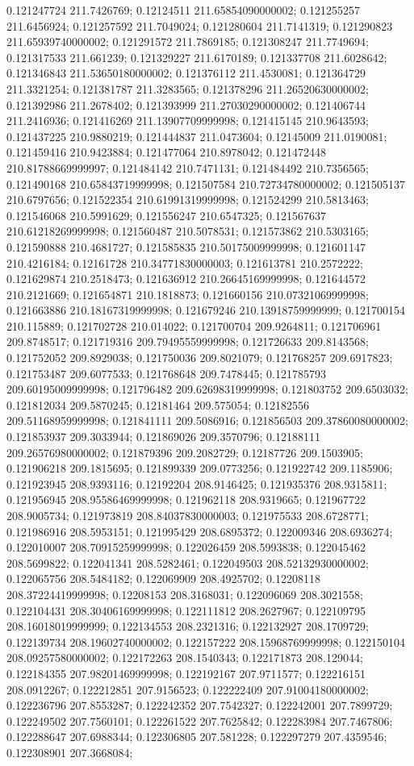 0.121247724 211.7426769; 0.12124511 211.65854090000002; 0.121255257 211.6456924; 0.121257592 211.7049024; 0.121280604 211.7141319; 0.121290823 211.65939740000002; 0.121291572 211.7869185; 0.121308247 211.7749694; 0.121317533 211.661239; 0.121329227 211.6170189; 0.121337708 211.6028642; 0.121346843 211.53650180000002; 0.121376112 211.4530081; 0.121364729 211.3321254; 0.121381787 211.3283565; 0.121378296 211.26520630000002; 0.121392986 211.2678402; 0.121393999 211.27030290000002; 0.121406744 211.2416936; 0.121416269 211.13907709999998; 0.121415145 210.9643593; 0.121437225 210.9880219; 0.121444837 211.0473604; 0.12145009 211.0190081; 0.121459416 210.9423884; 0.121477064 210.8978042; 0.121472448 210.81788669999997; 0.121484142 210.7471131; 0.121484492 210.7356565; 0.121490168 210.65843719999998; 0.121507584 210.72734780000002; 0.121505137 210.6797656; 0.121522354 210.61991319999998; 0.121524299 210.5813463; 0.121546068 210.5991629; 0.121556247 210.6547325; 0.121567637 210.61218269999998; 0.121560487 210.5078531; 0.121573862 210.5303165; 0.121590888 210.4681727; 0.121585835 210.50175009999998; 0.121601147 210.4216184; 0.12161728 210.34771830000003; 0.121613781 210.2572222; 0.121629874 210.2518473; 0.121636912 210.26645169999998; 0.121644572 210.2121669; 0.121654871 210.1818873; 0.121660156 210.07321069999998; 0.121663886 210.18167319999998; 0.121679246 210.13918759999999; 0.121700154 210.115889; 0.121702728 210.014022; 0.121700704 209.9264811; 0.121706961 209.8748517; 0.121719316 209.79495559999998; 0.121726633 209.8143568; 0.121752052 209.8929038; 0.121750036 209.8021079; 0.121768257 209.6917823; 0.121753487 209.6077533; 0.121768648 209.7478445; 0.121785793 209.60195009999998; 0.121796482 209.62698319999998; 0.121803752 209.6503032; 0.121812034 209.5870245; 0.12181464 209.575054; 0.12182556 209.51168959999998; 0.121841111 209.5086916; 0.121856503 209.37860080000002; 0.121853937 209.3033944; 0.121869026 209.3570796; 0.12188111 209.26576980000002; 0.121879396 209.2082729; 0.12187726 209.1503905; 0.121906218 209.1815695; 0.121899339 209.0773256; 0.121922742 209.1185906; 0.121923945 208.9393116; 0.12192204 208.9146425; 0.121935376 208.9315811; 0.121956945 208.95586469999998; 0.121962118 208.9319665; 0.121967722 208.9005734; 0.121973819 208.84037830000003; 0.121975533 208.6728771; 0.121986916 208.5953151; 0.121995429 208.6895372; 0.122009346 208.6936274; 0.122010007 208.70915259999998; 0.122026459 208.5993838; 0.122045462 208.5699822; 0.122041341 208.5282461; 0.122049503 208.52132930000002; 0.122065756 208.5484182; 0.122069909 208.4925702; 0.12208118 208.37224419999998; 0.12208153 208.3168031; 0.122096069 208.3021558; 0.122104431 208.30406169999998; 0.122111812 208.2627967; 0.122109795 208.16018019999999; 0.122134553 208.2321316; 0.122132927 208.1709729; 0.122139734 208.19602740000002; 0.122157222 208.15968769999998; 0.122150104 208.09257580000002; 0.122172263 208.1540343; 0.122171873 208.129044; 0.122184355 207.98201469999998; 0.122192167 207.9711577; 0.122216151 208.0912267; 0.122212851 207.9156523; 0.122222409 207.91004180000002; 0.122236796 207.8553287; 0.122242352 207.7542327; 0.122242001 207.7899729; 0.122249502 207.7560101; 0.122261522 207.7625842; 0.122283984 207.7467806; 0.122288647 207.6988344; 0.122306805 207.581228; 0.122297279 207.4359546; 0.122308901 207.3668084; 